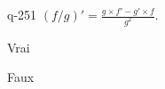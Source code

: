 \begin{truefalse}{q-251}
$(f / g)' = \frac{g\times f' - g'\times f}{g^2}$.
\item* Vrai
\item Faux
\end{truefalse}


